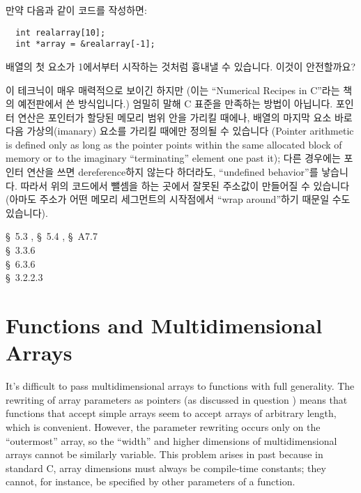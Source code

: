 \begin{faq}
	만약 다음과 같이 코드를 작성하면:
\begin{verbatim}
  int realarray[10];
  int *array = &realarray[-1];
\end{verbatim}

	배열의 첫 요소가 1에서부터 시작하는 것처럼 흉내낼 수 있습니다.
	이것이 안전할까요?

\A
	이 테크닉이 매우 매력적으로 보이긴 하지만 (이는 ``Numerical Recipes
	in C''라는 책의 예전판에서 쓴 방식입니다.) 엄밀히 말해 C 표준을
	만족하는 방법이 아닙니다.  포인터 연산은 포인터가 할당된 메모리
	범위 안을 가리킬 때에나, 배열의 마지막 요소 바로 다음 가상의(imanary)
	요소를 가리킬 때에만 정의될 수 있습니다 (Pointer arithmetic is defined
	only as long as the pointer points within the same allocated block of
	memory or to the imaginary ``terminating'' element one past it);
	다른 경우에는 포인터 연산을 쓰면 dereference하지 않는다 하더라도,
	``undefined behavior''를 낳습니다.
	따라서 위의 코드에서 뺄셈을 하는 곳에서 잘못된 주소값이
	만들어질 수 있습니다 (아마도 주소가 어떤 메모리 세그먼트의 시작점에서
	``wrap around''하기 때문일 수도 있습니다).

\R
	\cite{kr2} \S\ 5.3 , \S\ 5.4 , 
                   \S\ A7.7  \\
	\cite{ansi} \S\ 3.3.6 \\	   
	\cite{c89} \S\ 6.3.6 \\
	\cite{rationale} \S\ 3.2.2.3
\end{faq}

\section{Functions and Multidimensional Arrays}
It's difficult to pass multidimensional arrays to functions with full
generality.  The rewriting of array parameters as pointers (as discussed in
question ) means that functions that accept simple arrays seem to accept
arrays of arbitrary length, which is convenient.
However, the parameter rewriting occurs only on the ``outermost'' array,
so the ``width'' and higher dimensions of multidimensional arrays cannot be
similarly variable. This problem arises in past because in standard C, array
dimensions must always be compile-time constants; they cannot, for instance,
be specified by other parameters of a function.

